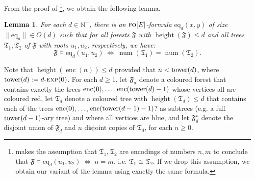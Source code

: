\documentclass[11pt]{article}
\newtheorem{lemma}[theorem]{Lemma}
\newcommand{\tower}{\textup{tower}}
\newcommand{\logic}[1]{\textsc{#1}}
\newcommand{\FO}{\logic{fo}}
\newcommand{\size}[1]{\|#1\|}
\newcommand{\struct}[1]{\mathfrak{#1}}
\newcommand{\FS}{\struct{F}}
\newcommand{\TS}{\struct{T}}
\newcommand{\iso}{\cong}
\newcommand{\num}{\operatorname{num}}
\newcommand{\height}{\operatorname{height}}
\newcommand{\Npos}{\mathbb{N}^{+}}
\newcommand{\bigo}{O}
\newcommand{\nexp}[1][d]{\ensuremath{#1\textnormal{-}\textsc{exp}}}
\newcommand{\enc}{\operatorname{enc}} \newcommand{\inc}{\textsc{inc}}
\begin{document}
From the proof of \cite[Lemma~10.21]{FlumGrohe2004}\footnote{\cite[Lemma~10.21]{FlumGrohe2004}
  makes the assumption that $\TS_{1},\TS_{2}$ are encodings of
  numbers $n,m$ to conclude that $\FS\models \text{eq}_d(u_1,u_2) \
  \iff \ n=m$, i.e. $\TS_{1} \iso \TS_{2}$. If we drop this assumption, we
  obtain our variant of the lemma using exactly the same formula.}, we
obtain the following lemma.

\begin{lemma}
  \label{lem:eq-formula}
  For each $d\in\Npos$, there is an $\FO[E]$-formula $\text{eq}_d(x,y)$
  of size $\size{\text{eq}_d}\in \bigo(d)$ such that for all forests
  $\FS$ with $\height(\FS)\leq d$ and all trees $\TS_1, \TS_2$ of $\FS$ with roots
  $u_1,u_2$, respectively, we have:
  \[ \FS\models \text{eq}_d(u_1,u_2) \ \iff \ \num(\TS_1)=\num(\TS_2). \]
\end{lemma}

Note that $\height(\enc(n))\leq d$ provided that $n<\tower(d)$, where $\tower(d) := \nexp[d](0)$.
For each $d\geq 1$, let $\FS_d$ denote a coloured forest that contains exactly the trees $\enc(0), \ldots,
\enc(\tower(d)-1)$ whose vertices all are coloured red, let $\TS_d$ denote a
coloured tree with $\height(\TS_d) \leq d$ that contains each of the trees
$\enc(0), \ldots, \enc(\tower(d-1)-1)$? as subtrees (e.g. a full $\tower(d-1)$-ary
tree) and where all vertices are blue, and let $\FS_d^n$ denote the disjoint
union of $\FS_d$ and $n$ disjoint copies of $\TS_d$, for each $n\geq 0$.
\end{document}
